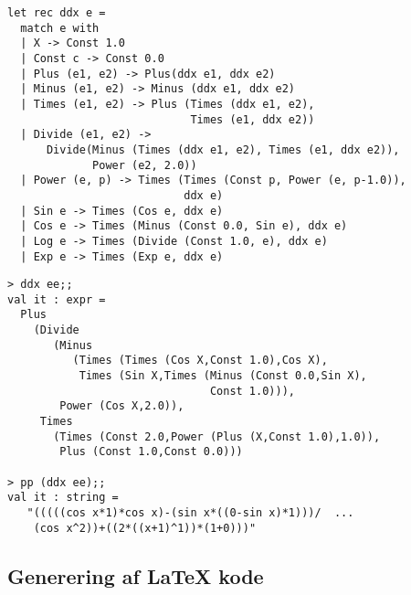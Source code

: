\documentclass[rgb]{beamer}
\begin{document}
\begin{frame}[fragile]
\begin{footnotesize}

\begin{lstlisting}[numbers=none,frame=none,mathescape]
let rec ddx e =
  match e with
  | X -> Const 1.0
  | Const c -> Const 0.0
  | Plus (e1, e2) -> Plus(ddx e1, ddx e2)
  | Minus (e1, e2) -> Minus (ddx e1, ddx e2)
  | Times (e1, e2) -> Plus (Times (ddx e1, e2),
                            Times (e1, ddx e2))
  | Divide (e1, e2) ->
      Divide(Minus (Times (ddx e1, e2), Times (e1, ddx e2)),
             Power (e2, 2.0))
  | Power (e, p) -> Times (Times (Const p, Power (e, p-1.0)),
                           ddx e)
  | Sin e -> Times (Cos e, ddx e)
  | Cos e -> Times (Minus (Const 0.0, Sin e), ddx e)
  | Log e -> Times (Divide (Const 1.0, e), ddx e)
  | Exp e -> Times (Exp e, ddx e)
\end{lstlisting}
\end{footnotesize}
\end{frame}

\begin{frame}[fragile]
\begin{footnotesize}

\begin{lstlisting}[numbers=none,frame=none,mathescape]
> ddx ee;;
val it : expr =
  Plus
    (Divide
       (Minus
          (Times (Times (Cos X,Const 1.0),Cos X),
           Times (Sin X,Times (Minus (Const 0.0,Sin X),
                               Const 1.0))),
        Power (Cos X,2.0)),
     Times
       (Times (Const 2.0,Power (Plus (X,Const 1.0),1.0)),
        Plus (Const 1.0,Const 0.0)))

> pp (ddx ee);;
val it : string =
   "(((((cos x*1)*cos x)-(sin x*((0-sin x)*1)))/  ...
    (cos x^2))+((2*((x+1)^1))*(1+0)))"
\end{lstlisting}
\end{footnotesize}
\end{frame}

\subsection{Generering af \LaTeX{} kode}
\end{document}
